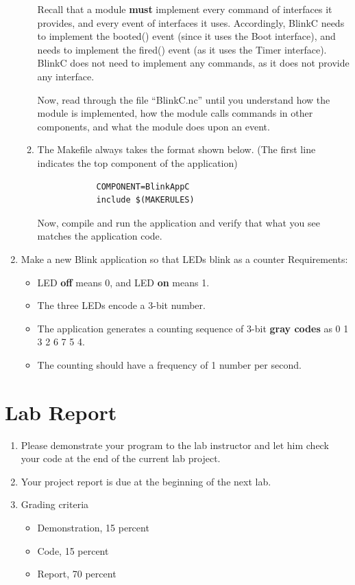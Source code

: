 \documentclass[letterpaper,12pt]{article}
\begin{document}
\begin{enumerate}
\begin{enumerate}
         Recall that a module \textbf{must} implement every command of interfaces it provides, and every event of interfaces it uses.
         Accordingly, BlinkC needs to implement the booted() event (since it uses the Boot interface), and needs to implement the fired() event (as it uses the Timer interface).
         BlinkC does not need to implement any commands, as it does not provide any interface.

         Now, read through the file “BlinkC.nc” until you understand how the module is implemented, how the module calls commands in other components, and what the module does upon an event.
      \item The Makefile always takes the format shown below. (The first line indicates the top component of the application)
         \begin{lstlisting}
            COMPONENT=BlinkAppC
            include $(MAKERULES)
         \end{lstlisting}
         Now, compile and run the application and verify that what you see matches the application code.
\end{enumerate}
   \item Make a new Blink application so that LEDs blink as a counter
      Requirements:
      \begin{itemize}
         \item LED \textbf{off} means 0, and LED \textbf{on} means 1.
         \item The three LEDs encode a 3-bit number.
         \item The application generates a counting sequence of 3-bit \textbf{gray codes} as 0 1 3 2 6 7 5 4.
         \item The counting should have a frequency of 1 number per second.
      \end{itemize}
\end{enumerate}
\section*{Lab Report}
\begin{enumerate}
   \item Please demonstrate your program to the lab instructor and let him check your code at the end of the current lab project.
   \item Your project report is due at the beginning of the next lab.
   \item Grading criteria
      \begin{itemize}
         \item Demonstration, 15 percent
         \item Code, 15 percent
         \item Report, 70 percent
      \end{itemize}
\end{enumerate}
\end{document}
